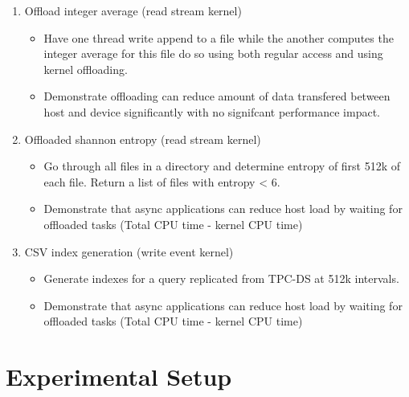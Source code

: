 \begin{enumerate}
    \item Offload integer average (read stream kernel)
    \begin{itemize}
        \item Have one thread write append to a file while the another computes
              the integer average for this file do so using both regular access
              and using kernel offloading.
        \item Demonstrate offloading can reduce amount of data transfered
              between host and device significantly with no signifcant
              performance impact.
    \end{itemize}
    \item Offloaded shannon entropy (read stream kernel)
    \begin{itemize}
        \item Go through all files in a directory and determine entropy of first
              512k of each file. Return a list of files with entropy < 6.
        \item Demonstrate that async applications can reduce host load by
              waiting for offloaded tasks (Total CPU time - kernel CPU time)
    \end{itemize}
    \item CSV index generation (write event kernel)
    \begin{itemize}
        \item Generate indexes for a query replicated from TPC-DS at 512k
              intervals.
        \item Demonstrate that async applications can reduce host load by
              waiting for offloaded tasks (Total CPU time - kernel CPU time)
    \end{itemize}
\end{enumerate}

\section{Experimental Setup}


%

